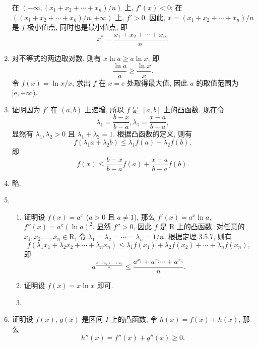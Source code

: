 \documentclass[a4paper, 10pt]{ctexart}
\begin{document}
\begin{enumerate}
        在 $(-\infty, (x_1 + x_2 + \cdots + x_n)/n)$ 上, $f'(x) < 0$; 在 $((x_1 + x_2 + \cdots + x_n)/n, +\infty)$ 上, $f' > 0$.
        因此, $x = (x_1 + x_2 + \cdots + x_n)/n$ 是 $f$ 极小值点, 同时也是最小值点, 即
        \[
            x^* = \frac{x_1 + x_2 + \cdots + x_n}{n}.    
        \]
    \item %
        对不等式的两边取对数, 则有 $x\ln a \geqslant a\ln x$, 即
        \[
            \frac{\ln a}{a} \geqslant \frac{\ln x}{x}.
        \]
        令 $f(x) = \ln x / x$, 求出 $f$ 在 $x = \mathrm{e}$ 处取得最大值, 因此 $a$ 的取值范围为 $[\mathrm{e}, +\infty)$.
    \item %
        {\heiti 证明}\quad 因为 $f'$ 在 $(a, b)$ 上递增, 所以 $f$ 是 $[a, b]$ 上的凸函数.
        现在令
        \[
            \lambda_1 = \frac{b - x}{b - a}, \lambda_1 = \frac{x - a}{b - a},    
        \]
        显然有 $\lambda_1, \lambda_2 > 0$ 且 $\lambda_1 + \lambda_2 = 1$. 根据凸函数的定义, 则有
        \[
            f(\lambda_1a + \lambda_2b) \leqslant \lambda_1f(a) + \lambda_2f(b),    
        \]
        即
        \[
            f(x) \leqslant \frac{b-x}{b-a}f(a) + \frac{x-a}{b-a}f(b).    
        \]
    \item %
        略.
    \item %
        \begin{enumerate}[(1)]
            \item %
                {\heiti 证明}\quad 设 $f(x) = a^x$ ($a > 0$ 且 $a \neq 1$), 那么 $f'(x) = a^x\ln a$, $f''(x) = a^x(\ln a)^2$. 显然 $f'' > 0$, 因此 $f$ 是 $\mathrm{R}$ 上的凸函数.
                对任意的 $x_1, x_2, \dots, x_n \in \mathrm{R}$, 令 $\lambda_1 = \lambda_2 = \cdots = \lambda_n = 1/n$, 根据定理 3.5.7, 则有
                \[
                    f(\lambda_1x_1 + \lambda_2x_2 + \cdots + \lambda_nx_n) \leqslant \lambda_1f(x_1) + \lambda_2f(x_2) + \cdots + \lambda_nf(x_n),
                \]
                即
                \[
                    a^\frac{x_1 + x_2 + \cdots + x_n}{n} \leqslant \frac{a^{x_1} + a^{x_2} \cdots + a^{x_n}}{n}.    
                \]
            \item %
                {\heiti 证明}\quad 设 $f(x) = x\ln x$ 即可.
            \item %
        \end{enumerate}
    \item %
        {\heiti 证明}\quad 设 $f(x)$, $g(x)$ 是区间 $I$ 上的凸函数, 令 $h(x) = f(x) + h(x)$, 那么
        \[
            h''(x) = f''(x) + g''(x) \geqslant 0.    
        \]

\end{enumerate}
\end{document}
